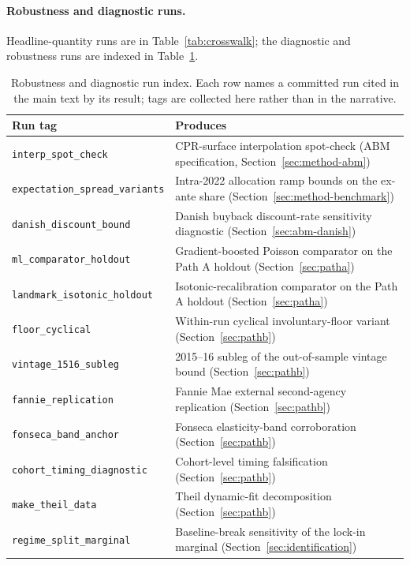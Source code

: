 \documentclass[12pt]{article}
\begin{document}
\paragraph{Robustness and diagnostic runs.} Headline-quantity runs are in Table~\ref{tab:crosswalk}; the diagnostic and robustness runs are indexed in Table~\ref{tab:runindex}.

\begin{table}[H]
\centering
\footnotesize
\begin{threeparttable}
\caption{Robustness and diagnostic run index. Each row names a committed run cited in the main text by its result; tags are collected here rather than in the narrative.}
\label{tab:runindex}
\begin{tabular}{@{}p{5.4cm}p{8.8cm}@{}}
\toprule
Run tag & Produces \\
\midrule
\texttt{interp\_spot\_check} & CPR-surface interpolation spot-check (ABM specification, Section~\ref{sec:method-abm}) \\
\texttt{expectation\_spread\_variants} & Intra-2022 allocation ramp bounds on the ex-ante share (Section~\ref{sec:method-benchmark}) \\
\texttt{danish\_discount\_bound} & Danish buyback discount-rate sensitivity diagnostic (Section~\ref{sec:abm-danish}) \\
\texttt{ml\_comparator\_holdout} & Gradient-boosted Poisson comparator on the Path A holdout (Section~\ref{sec:patha}) \\
\texttt{landmark\_isotonic\_holdout} & Isotonic-recalibration comparator on the Path A holdout (Section~\ref{sec:patha}) \\
\texttt{floor\_cyclical} & Within-run cyclical involuntary-floor variant (Section~\ref{sec:pathb}) \\
\texttt{vintage\_1516\_subleg} & 2015--16 subleg of the out-of-sample vintage bound (Section~\ref{sec:pathb}) \\
\texttt{fannie\_replication} & Fannie Mae external second-agency replication (Section~\ref{sec:pathb}) \\
\texttt{fonseca\_band\_anchor} & Fonseca elasticity-band corroboration (Section~\ref{sec:pathb}) \\
\texttt{cohort\_timing\_diagnostic} & Cohort-level timing falsification (Section~\ref{sec:pathb}) \\
\texttt{make\_theil\_data} & Theil dynamic-fit decomposition (Section~\ref{sec:pathb}) \\
\texttt{regime\_split\_marginal} & Baseline-break sensitivity of the lock-in marginal (Section~\ref{sec:identification}) \\

\end{tabular}
\end{threeparttable}
\end{table}
\end{document}
